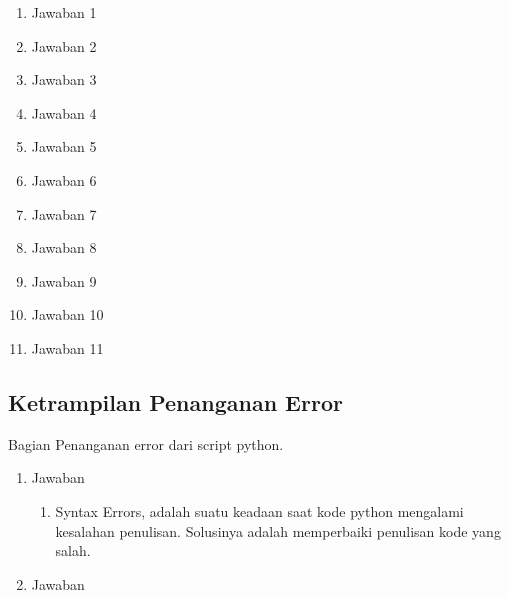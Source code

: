 \begin{enumerate}
\begin{enumerate}
\begin{itemize}
\begin{enumerate}

\item Jawaban 1


\item Jawaban 2


\item Jawaban 3


\item Jawaban 4


\item Jawaban 5


\item Jawaban 6


\item Jawaban 7


\item Jawaban 8


\item Jawaban 9


\item Jawaban 10


\item Jawaban 11


\end{enumerate}

\subsection{Ketrampilan Penanganan Error}
Bagian Penanganan error dari script python.
\begin{enumerate}
\item Jawaban
\begin{enumerate}
\item Syntax Errors, adalah suatu keadaan saat kode python mengalami kesalahan penulisan. Solusinya adalah memperbaiki penulisan kode yang salah.

\end{enumerate}
\item Jawaban																	

\end{enumerate}
\end{itemize}
\end{enumerate}



\end{enumerate}
